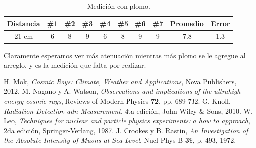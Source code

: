 \documentclass[a4paper,10pt]{article}
\numberwithin{equation}{section}
\begin{document}
\begin{table}[H]
\centering
\caption{Medición con plomo.}
\begin{tabular}{|c|c|c|c|c|c|c|c|c|c|}
\hline 
Distancia & \#1 & \#2 & \#3 & \#4 & \#5 & \#6 & \#7 & Promedio & Error \\ 
\hline 
21 cm & 6 & 8 & 9 & 6 & 8 & 9 & 9 & 7.8 & 1.3 \\ 
\hline 
\end{tabular}
\end{table}

Claramente esperamos ver más atenuación mientras más plomo se le agregue al arreglo, 
y es la medición que falta por realizar.

\begin{thebibliography}{10}
H. Mok, \emph{Cosmic Rays: Climate, Weather and Applications}, Nova Publishers, 
2012.
M. Nagano y A. Watson, \emph{Observations and implications of the ultrahigh-energy 
cosmic rays}, Reviews of Modern Physics \textbf{72}, pp. 689-732.
G. Knoll, \emph{Radiation Detection adn Measurement}, 4ta edición, John Wiley \& Sons,
2010.
W. Leo, \emph{Techniques for nuclear and particle physics experiments: a how to 
approach}, 2da edición, Springer-Verlang, 1987.
J. Crookes y B. Rastin, \emph{An Investigation of the Absolute Intensity of Muons at Sea Level}, 
Nucl Phys B \textbf{39}, p. 493, 1972.
\end{thebibliography}
\end{document}
